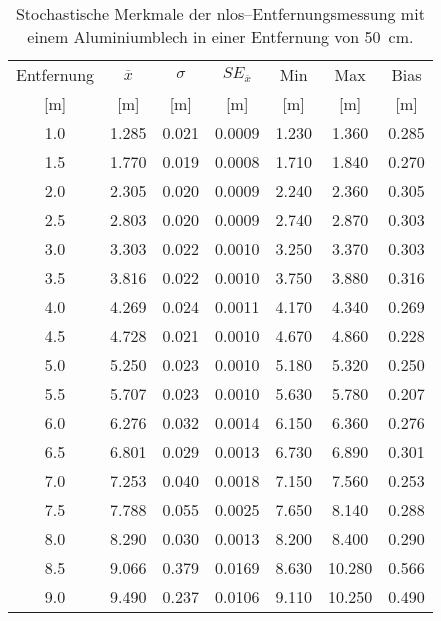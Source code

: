 \begin{appendices}
\begin{table}[h]
	\centering
	\begin{tabular}{||c||ccc||cc||c||}
\hline
Entfernung & $\overline{x}$ & $\sigma$ & $SE_{\overline{x}}$ & Min & Max & Bias \\
{[}\si{\meter}{]} & {[}\si{\meter}{]} & {[}\si{\meter}{]} & {[}\si{\meter}{]} & {[}\si{\meter}{]} & {[}\si{\meter}{]} & {[}\si{\meter}{]} \\
\hline
\hline
\num{1.0} & \num{1.285} & \num{0.021} & \num{0.0009} & \num{1.230} & \num{1.360} & \num{0.285} \\
\num{1.5} & \num{1.770} & \num{0.019} & \num{0.0008} & \num{1.710} & \num{1.840} & \num{0.270} \\
\num{2.0} & \num{2.305} & \num{0.020} & \num{0.0009} & \num{2.240} & \num{2.360} & \num{0.305} \\
\num{2.5} & \num{2.803} & \num{0.020} & \num{0.0009} & \num{2.740} & \num{2.870} & \num{0.303} \\
\num{3.0} & \num{3.303} & \num{0.022} & \num{0.0010} & \num{3.250} & \num{3.370} & \num{0.303} \\
\num{3.5} & \num{3.816} & \num{0.022} & \num{0.0010} & \num{3.750} & \num{3.880} & \num{0.316} \\
\num{4.0} & \num{4.269} & \num{0.024} & \num{0.0011} & \num{4.170} & \num{4.340} & \num{0.269} \\
\num{4.5} & \num{4.728} & \num{0.021} & \num{0.0010} & \num{4.670} & \num{4.860} & \num{0.228} \\
\num{5.0} & \num{5.250} & \num{0.023} & \num{0.0010} & \num{5.180} & \num{5.320} & \num{0.250} \\
\num{5.5} & \num{5.707} & \num{0.023} & \num{0.0010} & \num{5.630} & \num{5.780} & \num{0.207} \\
\num{6.0} & \num{6.276} & \num{0.032} & \num{0.0014} & \num{6.150} & \num{6.360} & \num{0.276} \\
\num{6.5} & \num{6.801} & \num{0.029} & \num{0.0013} & \num{6.730} & \num{6.890} & \num{0.301} \\
\num{7.0} & \num{7.253} & \num{0.040} & \num{0.0018} & \num{7.150} & \num{7.560} & \num{0.253} \\
\num{7.5} & \num{7.788} & \num{0.055} & \num{0.0025} & \num{7.650} & \num{8.140} & \num{0.288} \\
\num{8.0} & \num{8.290} & \num{0.030} & \num{0.0013} & \num{8.200} & \num{8.400} & \num{0.290} \\
\num{8.5} & \num{9.066} & \num{0.379} & \num{0.0169} & \num{8.630} & \num{10.280} & \num{0.566} \\
\num{9.0} & \num{9.490} & \num{0.237} & \num{0.0106} & \num{9.110} & \num{10.250} & \num{0.490} \\
\hline
	\end{tabular}
	\caption{Stochastische Merkmale der \Gls{nlos}--Entfernungsmessung mit einem Aluminiumblech in einer Entfernung von \SI{50}{\centi\meter}.}
	\label{tab:entfernungsmessung_2018_01_20_nlos_metal}
\end{table}


\end{appendices}

